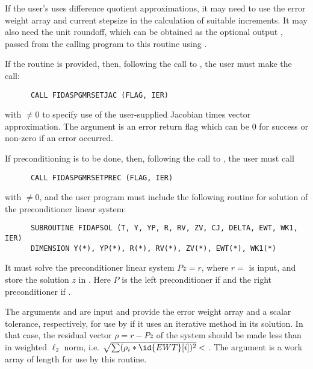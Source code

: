 \begin{Steps}
  If the user's  uses difference quotient approximations, it
  may need to use the error weight array  and current stepsize 
  in the calculation of suitable increments.  It may also need the unit
  roundoff, which can be obtained as the optional output ,
  passed from the calling program to this routine using .

  If the  routine is provided, then, 
  following the call to , the user must make the call:
\begin{verbatim}
      CALL FIDASPGMRSETJAC (FLAG, IER)
\end{verbatim}
  with  $\neq 0$ to specify use of the user-supplied Jacobian times
  vector approximation.
  The argument  is an error return flag which can be $0$ 
  for success or non-zero if an error occurred.
  
  If preconditioning is to be done, then, following the
  call to , the user must call
\begin{verbatim}
      CALL FIDASPGMRSETPREC (FLAG, IER)
\end{verbatim}
  with  $\neq 0$, and the user program must include the following routine
  for solution of the preconditioner linear system:
\begin{verbatim}
      SUBROUTINE FIDAPSOL (T, Y, YP, R, RV, ZV, CJ, DELTA, EWT, WK1, IER)
      DIMENSION Y(*), YP(*), R(*), RV(*), ZV(*), EWT(*), WK1(*)
\end{verbatim}
  It must solve the preconditioner linear system $Pz = r$, where $r =$  
  is input, and store the solution $z$ in . Here $P$ is the left 
  preconditioner if  and the right preconditioner if .
  
  The arguments  and  are input and provide the error weight
  array and a scalar tolerance, respectively, for use by  if it uses
  an iterative method in its solution.  In that case, the residual vector
  $\rho = r - Pz$ of the system should be made less than  in weighted
  $\ell_2$ norm, i.e. $\sqrt{\sum(\rho_i * \id{EWT}[i])^2} < $ .
  The argument  is a work array of length  for use by this
  routine.


\end{Steps}
